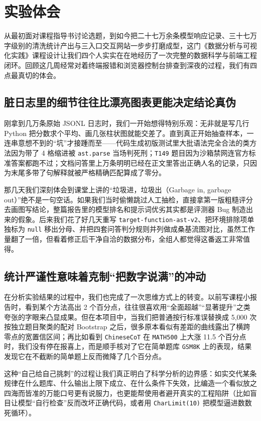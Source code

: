 \chapter{实验体会}\label{part:experience}

从最初面对课程指导书讨论选题，到如今把二十七万余条模型响应记录、三十七万字级别的清洗统计产出与三入口交互网站一步步打磨成型，这门《数据分析与可视化实践》课程设计让我们四个人实实在在地经历了一次完整的数据科学与前端工程闭环。回顾这几周经常对着终端报错和浏览器控制台排查到深夜的过程，我们有四点最真切的体会。

\section{脏日志里的细节往往比漂亮图表更能决定结论真伪}

刚拿到几万条原始 JSONL 日志时，我们一开始想得特别乐观：无非就是写几行 Python 把分数求个平均、画几张柱状图就能交差了。直到真正开始抽查样本，一连串意想不到的“坑”才接踵而至——代码生成初版测试里大批语法完全合法的类方法因为带了 4 格缩进被 \texttt{ast.parse} 当场判死刑；\texttt{T149} 题目因为沙箱禁网连官方标准答案都跑不过；文档问答里上万条明明已经在正文里答出正确人名的记录，只因为末尾多带了句解释就被严格精确匹配算成了零分。

那几天我们深刻体会到课堂上讲的“垃圾进，垃圾出（Garbage in, garbage out）”绝不是一句空话。如果我们当时偷懒跳过人工抽检，直接拿第一版粗糙评分去画图写结论，整篇报告里的模型排名和提示词优劣其实都是评测器 Bug 制造出来的假象。后来我们花了好几天重写 \texttt{target-function-ast-v2}、把环境排除项单独标为 \texttt{null} 移出分母、并把四套问答判分规则并列做成桑基流图对比，虽然工作量翻了一倍，但看着修正后干净自洽的数据分布，全组人都觉得这番返工非常值得。

\section{统计严谨性意味着克制“把数字说满”的冲动}

在分析实验结果的过程中，我们也完成了一次思维方式上的转变。以前写课程小报告时，看到某个方法高出 2 个百分点，往往很喜欢用“全面超越”“显著提升”之类夸张的字眼来凸显成果。但在本项目中，当我们把普通按行标准误替换成 5,000 次按独立题目聚类的配对 Bootstrap 之后，很多原本看似有差距的曲线露出了横跨零点的宽置信区间；再比如看到 \texttt{ChineseCoT} 在 \texttt{MATH500} 上大涨 11.5 个百分点时，我们没有停在报喜上，而是顺手核对了它在简单题库 \texttt{GSM8K} 上的表现，结果发现它在不截断的简单题上反而微降了几个百分点。

这种“自己给自己挑刺”的过程让我们真正明白了科学分析的边界感：如实交代某条规律在什么题库、什么输出上限下成立、在什么条件下失效，比编造一个看似放之四海而皆准的万能口号更有说服力，也更能帮使用者避开真实的工程陷阱（比如盲目让模型“自行检查”反而改坏正确代码，或者用 \texttt{CharLimit(10)} 把模型逼进数数死循环）。

